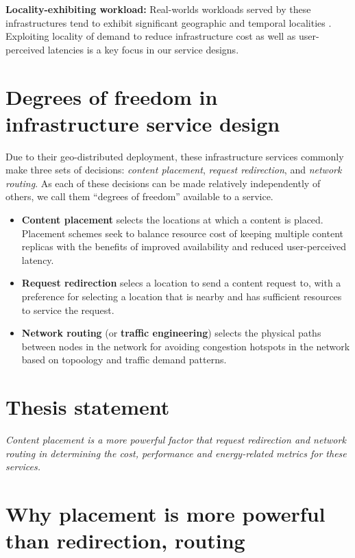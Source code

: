 \textbf{Locality-exhibiting workload:} Real-worlds workloads served by these infrastructures tend to exhibit significant geographic and temporal localities \cite{NCDN, youtubeUGC, vodP2Pbenefit, cellularvideotraffic}. Exploiting locality of demand to reduce infrastructure cost as well as user-perceived latencies is a key focus in our service designs.

\section{Degrees of freedom in infrastructure service design} Due to their geo-distributed deployment, these infrastructure services commonly make three sets of decisions: \emph{content placement}, \emph{request redirection}, and \emph{network routing}. As each of these decisions can be made relatively independently of others, we call them ``degrees of freedom'' available to a service. 
\begin{itemize}
	\item
	\textbf{Content placement} selects the locations at which a content is placed. Placement schemes seek to balance resource cost of keeping multiple content replicas with the benefits of improved availability and reduced user-perceived latency.
	\item
	 \textbf{Request redirection} selecs a location to send a content request to, with a preference for selecting a location that is nearby and has sufficient resources to service the request.
	\item
	 \textbf{Network routing} (or \textbf{traffic engineering}) selects the physical paths between nodes in the network for avoiding congestion hotspots in the network based on topoology and traffic demand patterns.
\end{itemize}


\section{Thesis statement}

\emph{Content placement is a more powerful factor that request redirection and network routing in determining the cost, performance and energy-related metrics for these services.}

\section{Why placement is more powerful than redirection, routing}


